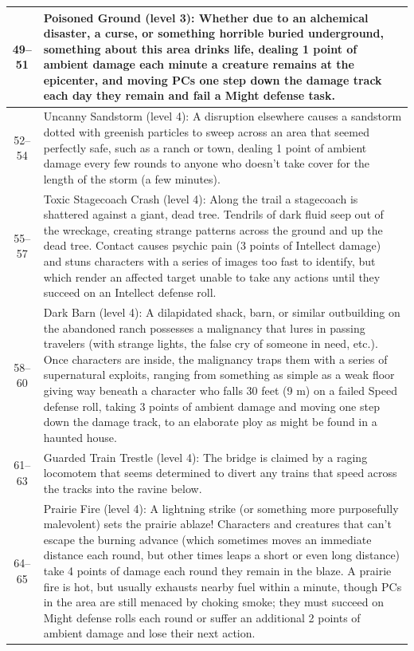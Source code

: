 \begin{longtable}{| c | p{15cm} |}
49–51 &  Poisoned Ground (level 3): Whether due to an alchemical disaster, a curse, or something horrible buried underground, something about this area drinks life, dealing 1 point of ambient damage each minute a creature remains at the epicenter, and moving PCs one step down the damage track each day they remain and fail a Might defense task. \\ \hline

52–54 &  Uncanny Sandstorm (level 4): A disruption elsewhere causes a sandstorm dotted with greenish particles to sweep across an area that seemed perfectly safe, such as a ranch or town, dealing 1 point of ambient damage every few rounds to anyone who doesn’t take cover for the length of the storm (a few minutes).  \\ \hline

55–57 &  Toxic Stagecoach Crash (level 4): Along the trail a stagecoach is shattered against a giant, dead tree. Tendrils of dark fluid seep out of the wreckage, creating strange patterns across the ground and up the dead tree. Contact causes psychic pain (3 points of Intellect damage) and stuns characters with a series of images too fast to identify, but which render an affected target unable to take any actions until they succeed on an Intellect defense roll.  \\ \hline

58–60 &  Dark Barn (level 4): A dilapidated shack, barn, or similar outbuilding on the abandoned ranch possesses a malignancy that lures in passing travelers (with strange lights, the false cry of someone in need, etc.). Once characters are inside, the malignancy traps them with a series of supernatural exploits, ranging from something as simple as a weak floor giving way beneath a character who falls 30 feet (9 m) on a failed Speed defense roll, taking 3 points of ambient damage and moving one step down the damage track, to an elaborate ploy as might be found in a haunted house.  \\ \hline

61–63 &  Guarded Train Trestle (level 4): The bridge is claimed by a raging locomotem that seems determined to divert any trains that speed across the tracks into the ravine below. \\ \hline

64–65 &  Prairie Fire (level 4): A lightning strike (or something more purposefully malevolent) sets the prairie ablaze! Characters and creatures that can’t escape the burning advance (which sometimes moves an immediate distance each round, but other times leaps a short or even long distance) take 4 points of damage each round they remain in the blaze. A prairie fire is hot, but usually exhausts nearby fuel within a minute, though PCs in the area are still menaced by choking smoke; they must succeed on Might defense rolls each round or suffer an additional 2 points of ambient damage and lose their next action.  \\ \hline


\end{longtable}
